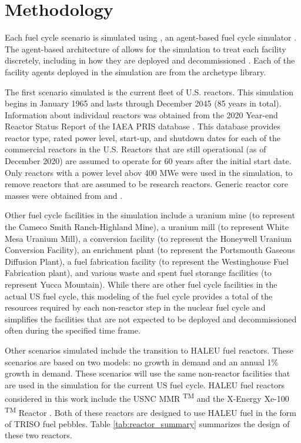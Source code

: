\section{Methodology}

Each fuel cycle scenario is simulated using \Cyclus, an 
agent-based fuel cycle simulator \cite{huff_fundamental_2016}. 
The agent-based architecture of \Cyclus allows for the simulation to treat
each facility discretely, including in how they are deployed and 
decommissioned \cite{huff_fundamental_2016}. Each of the facility agents 
deployed in the simulation are from the \Cycamore archetype library. 

The first scenario simulated is the current fleet of U.S. reactors. This 
simulation begins in January 1965 and lasts through December 2045 (85 
years in total). Information about individaul reactors was obtained 
from the 2020 Year-end Reactor Status Report of the \gls{IAEA} \gls{PRIS} 
database \cite{noauthor_power_1989}. 
This database provides reactor type, rated power level, start-up, and 
shutdown dates for each of the commercial reactors in the U.S. Reactors 
that are still operational (as of December 2020) are assumed to operate 
for 60 years after the 
initial start date. Only reactors with a power level abov 400 MWe were 
used in the simulation, to remove reactors that are assumed to be research 
reactors. Generic reactor core masses were obtained from 
\cite{todreas_nuclear_2012} and \cite{cacuci_handbook_2010}. 

Other fuel cycle facilities in the simulation include a uranium mine (to 
represent the Cameco Smith Ranch-Highland Mine), a uranium mill (to 
represent White Mesa Uranium Mill), a conversion facility (to represent 
the Honeywell Uranium Conversion Facility), an enrichment plant (to represent 
the Portsmouth Gaseous Diffusion Plant), a fuel fabrication facility (to 
represent the Westinghouse Fuel Fabrication plant), and various waste and 
spent fuel storange facilities (to represent Yucca Mountain). While there
are other fuel cycle facilities in the actual US fuel cycle, this 
modeling of the fuel cycle provides a total of the resources required 
by each non-reactor step in the nuclear fuel cycle and simplifies the 
facilities that are not expected to be deployed and decommissioned often 
during the specified time frame. 

Other scenarios simulated include the transition to \gls{HALEU} fuel 
reactors. These scenarios are based on two models: no growth in demand 
and an annual 1\% growth in demand. These scenarios will use the same 
non-reactor facilities that are used in the simulation for the current 
US fuel cycle. \gls{HALEU} fuel reactors 
considered in this work include the \gls{USNC} \gls{MMR} \textsuperscript{TM}
\cite{mitchell_usnc_2020} and the X-Energy Xe-100 \textsuperscript{TM} 
Reactor \cite{harlan_x-energy_2018}\cite{hussain_advances_2018}. Both of 
these reactors are designed 
to use \gls{HALEU} fuel in the form of \gls{TRISO} fuel pebbles. Table 
\ref{tab:reactor_summary} summarizes the design of these two reactors.

